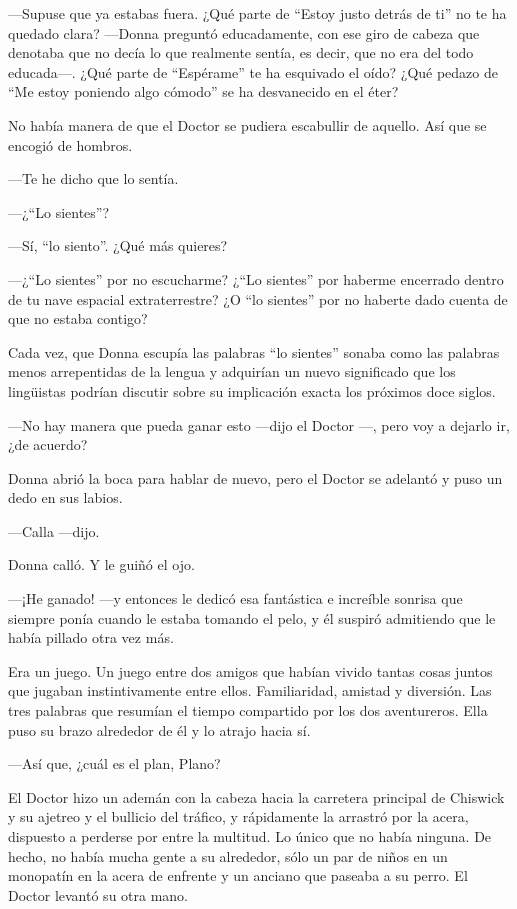 ---Supuse que ya estabas fuera. ¿Qué parte de ``Estoy justo detrás de
ti'' no te ha quedado clara? ---Donna preguntó educadamente, con ese
giro de cabeza que denotaba que no decía lo que realmente sentía, es
decir, que no era del todo educada---. ¿Qué parte de ``Espérame'' te ha
esquivado el oído? ¿Qué pedazo de ``Me estoy poniendo algo cómodo'' se
ha desvanecido en el éter?

No había manera de que el Doctor se pudiera escabullir de aquello. Así
que se encogió de hombros.

---Te he dicho que lo sentía.

---¿``Lo sientes''?

---Sí, ``lo siento''. ¿Qué más quieres?

---¿``Lo sientes'' por no escucharme? ¿``Lo sientes'' por haberme
encerrado dentro de tu nave espacial extraterrestre? ¿O ``lo sientes''
por no haberte dado cuenta de que no estaba contigo?

Cada vez, que Donna escupía las palabras ``lo sientes'' sonaba como las
palabras menos arrepentidas de la lengua y adquirían un nuevo
significado que los lingüistas podrían discutir sobre su implicación
exacta los próximos doce siglos.

---No hay manera que pueda ganar esto ---dijo el Doctor ---, pero voy a
dejarlo ir, ¿de acuerdo?

Donna abrió la boca para hablar de nuevo, pero el Doctor se adelantó y
puso un dedo en sus labios.

---Calla ---dijo.

Donna calló. Y le guiñó el ojo.

---¡He ganado! ---y entonces le dedicó esa fantástica e increíble
sonrisa que siempre ponía cuando le estaba tomando el pelo, y él suspiró
admitiendo que le había pillado otra vez más.

Era un juego. Un juego entre dos amigos que habían vivido tantas cosas
juntos que jugaban instintivamente entre ellos. Familiaridad, amistad y
diversión. Las tres palabras que resumían el tiempo compartido por los
dos aventureros. Ella puso su brazo alrededor de él y lo atrajo hacia
sí.

---Así que, ¿cuál es el plan, Plano?

El Doctor hizo un ademán con la cabeza hacia la carretera principal de
Chiswick y su ajetreo y el bullicio del tráfico, y rápidamente la
arrastró por la acera, dispuesto a perderse por entre la multitud. Lo
único que no había ninguna. De hecho, no había mucha gente a su
alrededor, sólo un par de niños en un monopatín en la acera de enfrente
y un anciano que paseaba a su perro. El Doctor levantó su otra mano.

